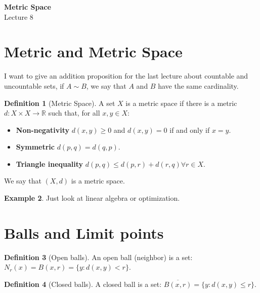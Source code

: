 \documentclass[12pt]{article}
\newcommand{\RR}{\mathbb{R}}   %
\theoremstyle{definition}
\newtheorem{definition}{Definition}[section]
\newtheorem{example}[definition]{Example}
\theoremstyle{plain}
\begin{document}

\begin{center}
    {\Large \textbf{Metric Space}}\\[0.5em]
    {\large Lecture 8}
\end{center}

\tableofcontents

\newpage


\section{Metric and Metric Space}

\begin{note}
I want to give an addition proposition for the last lecture about countable and uncountable sets, if $A \sim B$, we say that $A$ and $B$ have the same cardinality.
\end{note}

\begin{definition}[Metric Space]
A set $X$ is a metric space if there is a metric $d: X\times X \rightarrow \RR$ such that, for all $x, y \in X$:
\begin{itemize}
    \item \textbf{Non-negativity} $d(x,y) \ge 0$ and $d(x,y) = 0$ if and only if $x=y$.
    \item \textbf{Symmetric} $d(p,q) = d(q,p)$.
    \item \textbf{Triangle inequality} $d(p,q) \le d(p,r)+d(r,q) \forall r \in X$.
\end{itemize}
We say that $(X, d)$ is a metric space.
\end{definition}

\begin{example}
Just look at linear algebra or optimization.
\end{example}

\section{Balls and Limit points}

\begin{definition}[Open balls]
An open ball (neighbor) is a set: $N_r(x)=B(x,r)=\{y: d(x,y) < r\}$.
\end{definition}

\begin{definition}[Closed balls]
A closed ball is a set: $\overline{B(x,r)}=\{y: d(x,y) \le r\}$.
\end{definition}
\end{document}
